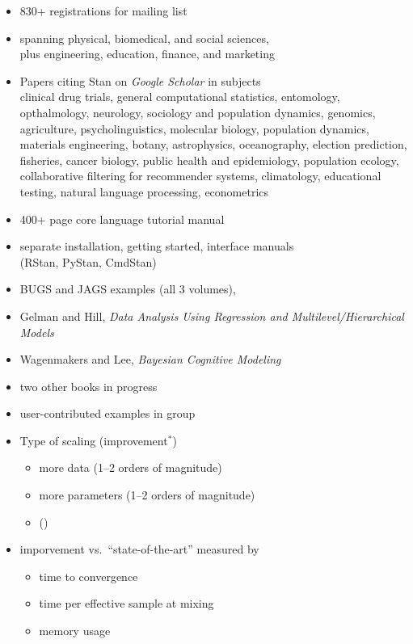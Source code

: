 \documentclass[10pt]{report}
\newcommand{\sld}[1]{\newpage{\noindent\LARGE \ \ \
    \textcolor{MidnightBlue}{\bfseries #1}}\vspace*{4pt}}
\newcommand{\myemph}[1]{{\color{MidnightBlue}{\bfseries #1}}}
\begin{document}
\sld{Who's Using Stan?}
\begin{itemize}
\item 830+ registrations for mailing list
\item spanning physical, biomedical, and social sciences, 
\\ plus engineering, education, finance, and marketing

\item Papers citing Stan on {\slshape Google Scholar} in subjects
\\[3pt]
{\footnotesize clinical drug
trials, general computational statistics, entomology, opthalmology,
neurology, sociology and population dynamics, genomics, agriculture,
psycholinguistics, molecular biology, population dynamics, materials
engineering, botany, astrophysics, oceanography, election prediction,
fisheries, cancer biology, public health and epidemiology, population
ecology, collaborative filtering for recommender systems, climatology,
educational testing, natural language processing, econometrics}
\end{itemize}

\sld{Documentation and Examples}
%
\begin{itemize}
\item 400+ page core language tutorial manual
\item separate installation, getting started, interface manuals 
\\ {\footnotesize  (RStan, PyStan, CmdStan)}
\item BUGS and JAGS examples (all 3 volumes), 
\item Gelman and Hill, {\slshape Data Analysis Using Regression and
    Multilevel/Hierarchical Models}
\item Wagenmakers and Lee, {\slshape Bayesian Cognitive Modeling}
\item two other books in progress
\item user-contributed examples in group
\end{itemize}

\sld{Scaling and Evaluation}
\begin{itemize}
\item Type of scaling \hfill (improvement$^{*}$)
\vspace*{-4pt}
\begin{itemize}\small
\item more data \hfill (1--2 orders of magnitude)
\item more parameters \hfill (1--2 orders of magnitude)
\item \myemph{more complex models} \hfill ({\large \myemph{$\infty$}})
\end{itemize}
\item imporvement vs.\ ``state-of-the-art'' \myemph{black-box MCMC}
measured by
\vspace*{-4pt}
\begin{itemize}\small
\item time to convergence
\item time per effective sample at mixing
\item memory usage
\end{itemize}
\end{itemize}
\end{document}
